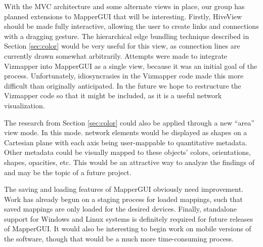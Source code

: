 With the MVC architecture and some alternate views in place, our group has planned extensions to MapperGUI that will be interesting. Firstly, HiveView should be made fully interactive, allowing the user to create links and connections with a dragging gesture. The hierarchical edge bundling technique described in Section \ref{sec:color} would be very useful for this view, as connection lines are currently drawn somewhat arbitrarily. Attempts were made to integrate Vizmapper into MapperGUI as a single view, because it was an initial goal of the process. Unfortunately, idiosyncrasies in the Vizmapper code made this more difficult than originally anticipated. In the future we hope to restructure the Vizmapper code so that it might be included, as it is a useful network visualization. 

The research from Section \ref{sec:color} could also be applied through a new ``area'' view mode. In this mode. network elements would be displayed as shapes on a Cartesian plane with each axis being user-mappable to quantitative metadata. Other metadata could be visually mapped to these objects' colors, orientations, shapes, opacities, etc. This would be an attractive way to analyze the findings of  and may be the topic of a future project. 

The saving and loading features of MapperGUI obviously need improvement. Work has already begun on a staging process for loaded mappings, such that saved mappings are only loaded for the desired devices. Finally, standalone support for Windows and Linux systems is definitely required for future releases of MapperGUI. It would also be interesting to begin work on mobile versions of the software, though that would be a much more time-consuming process. 



	